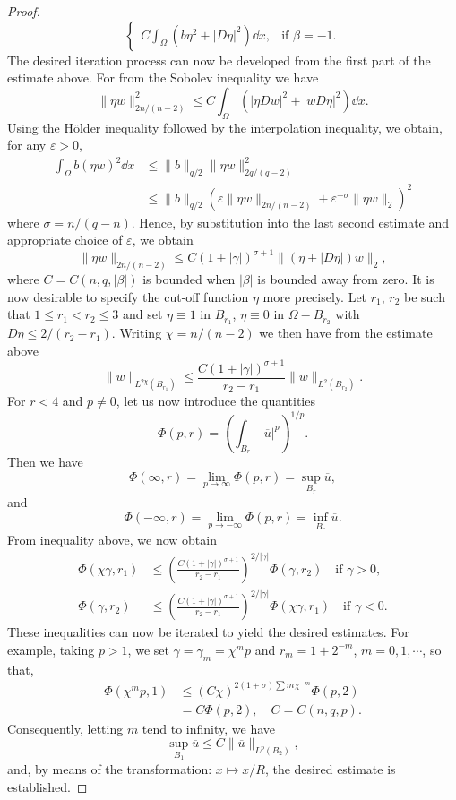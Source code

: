 \begin{proof}
\begin{equation}
\begin{cases}
			C\int_\Omega (b\eta^2 + |D\eta|^2)\dd x, & \text{if }\beta = -1.
		\end{cases}
	\end{equation}
	The desired iteration process can now be developed from the first part of the estimate above.
	For from the Sobolev inequality we have
	\[
		\|\eta w\|^2_{2n/(n-2)} \leq C\int_\Omega (|\eta Dw|^2 + |wD\eta|^2)\dd x.
	\]
	Using the H\"older inequality followed by the interpolation inequality, we obtain, for any $\varepsilon>0$,
	\begin{align*}
		\int_\Omega b(\eta w)^2\dd x 
			&\leq \|b\|_{q/2}\|\eta w\|_{2q/(q-2)}^2\\
			&\leq \|b\|_{q/2}(\varepsilon\|\eta w\|_{2n/(n-2)} + \varepsilon^{-\sigma}\|\eta w\|_2)^2
	\end{align*}
	where $\sigma = n/(q-n)$. 
	Hence, by substitution into the last second estimate and appropriate choice of $\varepsilon$, 
	we obtain
	\begin{equation*}
		\|\eta w\|_{2n/(n-2)} \leq C(1+|\gamma|)^{\sigma+1}\|(\eta + |D\eta|)w\|_2,
	\end{equation*}
	where $C=C(n,q,|\beta|)$ is bounded when $|\beta|$ is bounded away from zero.
	It is now desirable to specify the cut-off function $\eta$ more precisely. 
	Let $r_1$, $r_2$ be such that $1\leq r_1 < r_2 \leq 3$ and set $\eta\equiv 1$ in $B_{r_1}$,
	$\eta\equiv0$ in $\Omega-B_{r_2}$ with $D\eta\leq 2/(r_2-r_1)$.
	Writing $\chi=n/(n-2)$ we then have from the estimate above
	\[
		\|w\|_{L^{2\chi}(B_{r_1})} \leq \frac{C(1+|\gamma|)^{\sigma + 1}}{r_2-r_1}\|w\|_{L^2(B_{r_2})}.
	\]
	For $r<4$ and $p\neq0$, let us now introduce the quantities
	\begin{equation}
		\Phi(p,r) = \left(\int_{B_r}|\overline{u}|^p\right)^{1/p}.
	\end{equation}
	Then we have
	\[
		\Phi(\infty, r) = \lim_{p\to\infty} \Phi(p,r) = \sup_{B_r}\overline{u},
	\]
	and 
	\[
		\Phi(-\infty, r) = \lim_{p\to -\infty}\Phi(p,r) = \inf_{B_r}\overline{u}.
	\]
	From inequality above, we now obtain
	\begin{align*}
		\Phi(\chi\gamma, r_1) &\leq \left(\frac{C(1+|\gamma|)^{\sigma+1}}{r_2-r_1}\right)^{2/|\gamma|}\Phi(\gamma,r_2)\quad \text{if } \gamma > 0,\\
		\Phi(\gamma, r_2) &\leq \left(\frac{C(1+|\gamma|)^{\sigma+1}}{r_2-r_1}\right)^{2/|\gamma|}\Phi(\chi\gamma,r_1)\quad \text{if } \gamma < 0.
	\end{align*}
	These inequalities can now be iterated to yield the desired estimates. 
	For example, taking $p>1$, we set $\gamma = \gamma_m = \chi^mp$ and $r_m = 1 + 2^{-m}$, $m = 0, 1, \cdots$,
	so that, 
	\begin{align*}
		\Phi(\chi^mp,1) &\leq (C\chi)^{2(1+\sigma)\sum m\chi^{-m}}\Phi(p, 2)\\
			& = C\Phi(p,2), \quad C = C(n,q,p).	
	\end{align*}
	Consequently, letting $m$ tend to infinity, we have
	\[
		\sup_{B_1}\overline{u} \leq C\|\overline{u}\|_{L^p(B_2)},
	\]
	and, by means of the transformation: $x\mapsto x/R$, the desired estimate is established.
\end{proof}


